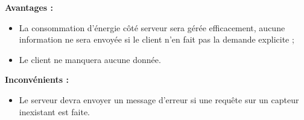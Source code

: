 \textbf{Avantages :}
\begin{itemize}
\item La consommation d'énergie côté serveur sera gérée efficacement, aucune information ne sera envoyée si le client n'en fait pas la demande explicite ;
\item Le client ne manquera aucune donnée.
\end{itemize}

\textbf{Inconvénients :}
\begin{itemize}
\item Le serveur devra envoyer un message d'erreur si une requête sur un capteur inexistant est faite.
\end{itemize}